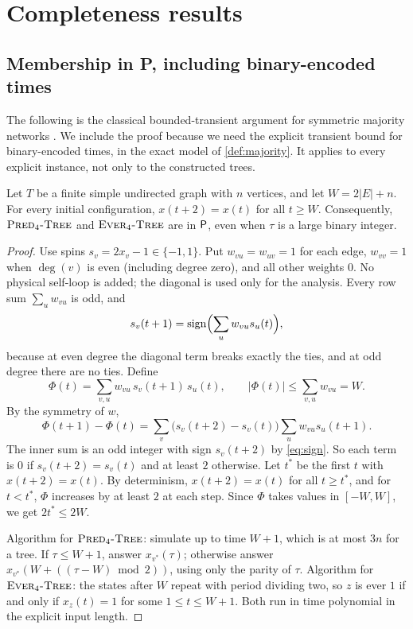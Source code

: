 \section{Completeness results}\label{sec:completeness}

\subsection{Membership in P, including binary-encoded times}\label{sec:membership}

The following is the classical bounded-transient argument for symmetric majority networks
\cite{GO80,PS83,GFP85}. We include the proof because we need the explicit transient bound for
binary-encoded times, in the exact model of \cref{def:majority}. It applies to every explicit
instance, not only to the constructed trees.

\begin{proposition}[Membership]\label{prop:membership}
Let $T$ be a finite simple undirected graph with $n$ vertices, and let $W=2|E|+n$. For every initial
configuration, $x(t+2)=x(t)$ for all $t\ge W$. Consequently, $\textsc{Pred}_4\textsc{-Tree}$ and $\textsc{Ever}_4\textsc{-Tree}$ are in $\mathsf{P}$, even
when $\tau$ is a large binary integer.
\end{proposition}

\begin{proof}
Use spins $s_v=2x_v-1\in\{-1,1\}$. Put $w_{vu}=w_{uv}=1$ for each edge, $w_{vv}=1$ when $\deg(v)$ is
even (including degree zero), and all other weights $0$. No physical self-loop is added; the diagonal
is used only for the analysis. Every row sum $\sum_u w_{vu}$ is odd, and
\begin{equation}\label{eq:sign}
s_v(t+1)=\operatorname{sign}\Bigl(\sum_u w_{vu}s_u(t)\Bigr),
\end{equation}
because at even degree the diagonal term breaks exactly the ties, and at odd degree there are no
ties. Define
\[
\Phi(t)=\sum_{v,u}w_{vu}\,s_v(t+1)\,s_u(t),\qquad |\Phi(t)|\le\sum_{v,u}w_{vu}=W.
\]
By the symmetry of $w$,
\begin{equation}\label{eq:energy}
\Phi(t+1)-\Phi(t)=\sum_v\bigl(s_v(t+2)-s_v(t)\bigr)\sum_u w_{vu}s_u(t+1).
\end{equation}
The inner sum is an odd integer with sign $s_v(t+2)$ by \eqref{eq:sign}. So each term is $0$ if
$s_v(t+2)=s_v(t)$ and at least $2$ otherwise. Let $t^\ast$ be the first $t$ with $x(t+2)=x(t)$. By
determinism, $x(t+2)=x(t)$ for all $t\ge t^\ast$, and for $t<t^\ast$, $\Phi$ increases by at least $2$
at each step. Since $\Phi$ takes values in $[-W,W]$, we get $2t^\ast\le 2W$.

Algorithm for $\textsc{Pred}_4\textsc{-Tree}$: simulate up to time $W+1$, which is at most $3n$ for a tree. If $\tau\le W+1$, answer $x_{v^\ast}(\tau)$;
otherwise answer $x_{v^\ast}(W+((\tau-W)\bmod 2))$, using only the parity of $\tau$. Algorithm for
$\textsc{Ever}_4\textsc{-Tree}$: the states after $W$ repeat with period dividing two, so $z$ is ever $1$ if and only if
$x_z(t)=1$ for some $1\le t\le W+1$. Both run in time polynomial in the explicit input length.
\end{proof}

